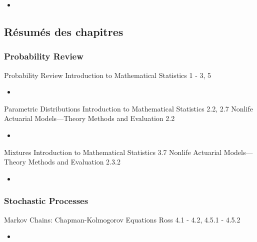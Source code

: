 \documentclass[12pt, titlepage, french]{report}
\begin{document}
\begin{YTB_vids}
\begin{itemize}
	\item	
\end{itemize}
\end{YTB_vids}

\subsection{Résumés des chapitres}

\subsubsection*{Probability Review}

\begin{CHPT_SUMM_AUTO_NUMB}[label = {L.-1}]{Probability Review}
Introduction to Mathematical Statistics 1 - 3, 5
	\begin{itemize}
		\item	
	\end{itemize}
\end{CHPT_SUMM_AUTO_NUMB}

\begin{CHPT_SUMM_AUTO_NUMB}[label = {L.-2}]{Parametric Distributions}
Introduction to Mathematical Statistics 2.2, 2.7
Nonlife Actuarial Models---Theory Methods and Evaluation 2.2
	\begin{itemize}
		\item	
	\end{itemize}
\end{CHPT_SUMM_AUTO_NUMB}

\begin{CHPT_SUMM_AUTO_NUMB}[label = {L.-3}]{Mixtures}
Introduction to Mathematical Statistics 3.7
Nonlife Actuarial Models---Theory Methods and Evaluation 2.3.2
	\begin{itemize}
		\item	
	\end{itemize}
\end{CHPT_SUMM_AUTO_NUMB}

\subsubsection*{Stochastic Processes}

\begin{CHPT_SUMM_AUTO_NUMB}[label = {L.-4}]{Markov Chains: Chapman-Kolmogorov Equations}
Ross 4.1 - 4.2, 4.5.1 - 4.5.2
	\begin{itemize}
		\item	
	\end{itemize}
\end{CHPT_SUMM_AUTO_NUMB}
\end{document}
